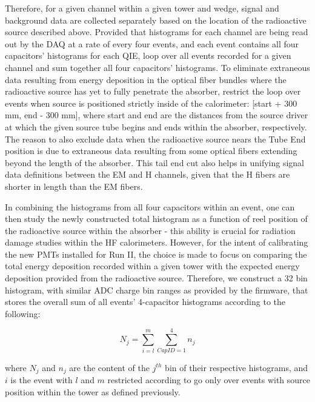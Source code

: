 Therefore, for a given channel within a given tower and wedge, signal and background data are collected separately based on the location of the
radioactive source described above. Provided that histograms for each channel
are being read out by the DAQ at a rate of every four events, and each event
contains all four capacitors' histograms for each QIE, loop over all
events recorded for a given channel and sum together all four capacitors'
histograms. To eliminate extraneous data resulting from energy deposition
in the optical fiber bundles where the radioactive source has yet to fully
penetrate the absorber, restrict the loop over events when source is positioned strictly inside of the calorimeter: [start + 300 mm, end - 300 mm],
where start and end are the distances from the source driver at
which the given source tube begins and ends within the absorber, respectively.
The reason to also exclude data when the radioactive source nears the Tube End
position is due to extraneous data resulting from some optical fibers extending
beyond the length of the absorber. This tail end cut also helps in unifying
signal data definitions between the EM and H channels, given that the H fibers
are shorter in length than the EM fibers.

In combining the histograms from all four capacitors within an event, one can
then study the newly constructed total histogram as a function of reel position
of the radioactive source within the absorber - this ability is crucial for
radiation damage studies within the HF calorimeters. However, for the intent of
calibrating the new PMTs installed for Run II, the choice is made to focus on comparing the total energy deposition recorded within a given tower with the expected energy deposition provided from the radioactive source. Therefore, we construct a 32 bin histogram, with similar ADC charge bin ranges as provided by the firmware, that stores the overall sum of all events' 4-capacitor histograms according to the following:
\begin{center}
   \begin{equation}
      \label{eq:Histo_Sum}
      N_j = \sum\limits_{i=l}^m \sum\limits_{CapID=1}^4 n_j
   \end{equation}
\end{center}

where $N_j$ and $n_j$ are the content of the $j^{th}$ bin of their respective
histograms, and $i$ is the event with $l$ and $m$ restricted according to
go only over events with source position within the tower as defined previously.


